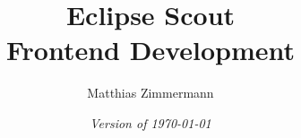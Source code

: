
\author{Matthias Zimmermann}
\title{
\Huge\bf Eclipse Scout\\
\huge Frontend Development
}
\ifpdf
  \isodate
\fi
\date{\emph{Version of \today}}
\maketitle

